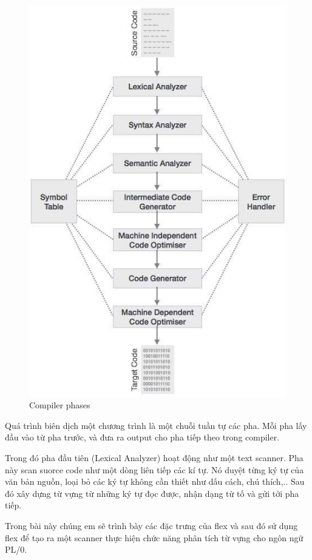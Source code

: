 \documentclass[14pt,a4paper]{extreport}
\begin{document}
\begin{figure}
	\centering
	\includegraphics[scale=.6]{compiler_phases}
	\caption{Compiler phases}
\end{figure}

Quá trình biên dịch một chương trình là một chuỗi tuần tự các pha. Mỗi pha lấy đầu vào từ pha trước, và đưa ra output cho pha tiếp theo trong compiler. 

Trong đó pha đầu tiên (Lexical Analyzer) hoạt động như một text scanner. Pha này scan suorce code như một dòng liên tiếp các kí tự. Nó duyệt từng ký tự của văn bản nguồn, loại bỏ các ký tự không cần thiết như dấu cách, chú thích,.. Sau đó xây dựng từ vựng từ những ký tự đọc được, nhận dạng từ tố và gửi tới pha tiếp. 
 
Trong bài này chúng em sẽ trình bày các đặc trưng của flex và sau đó sử dụng flex để tạo ra một scanner thực hiện chức năng phân tích từ vựng cho ngôn ngữ PL/0.
\end{document}
